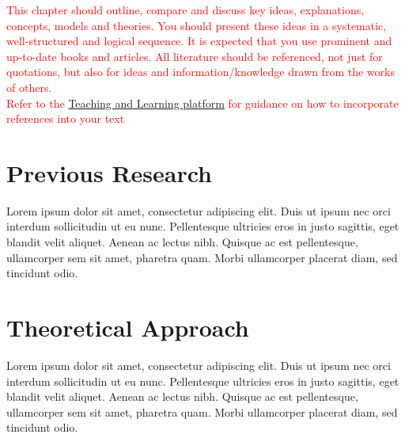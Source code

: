 \textcolor{red}{This chapter should outline, compare and discuss key ideas, explanations, concepts, models and theories. You should present these ideas in a systematic, well-structured and logical sequence. It is expected that you use prominent and up-to-date books and articles. All literature should be referenced, not just for quotations, but also for ideas and information/knowledge drawn from the works of others.\\
Refer to the \href{http://libguides.lub.lu.se/plagiarism}{Teaching and Learning platform} for guidance on how to incorporate references into your text}

\section{Previous Research}
Lorem ipsum dolor sit amet, consectetur adipiscing elit. Duis ut ipsum nec orci interdum sollicitudin ut eu nunc. Pellentesque ultricies eros in justo sagittis, eget blandit velit aliquet. Aenean ac lectus nibh. Quisque ac est pellentesque, ullamcorper sem sit amet, pharetra quam. Morbi ullamcorper placerat diam, sed tincidunt odio.

\section{Theoretical Approach}
Lorem ipsum dolor sit amet, consectetur adipiscing elit. Duis ut ipsum nec orci interdum sollicitudin ut eu nunc. Pellentesque ultricies eros in justo sagittis, eget blandit velit aliquet. Aenean ac lectus nibh. Quisque ac est pellentesque, ullamcorper sem sit amet, pharetra quam. Morbi ullamcorper placerat diam, sed tincidunt odio.
